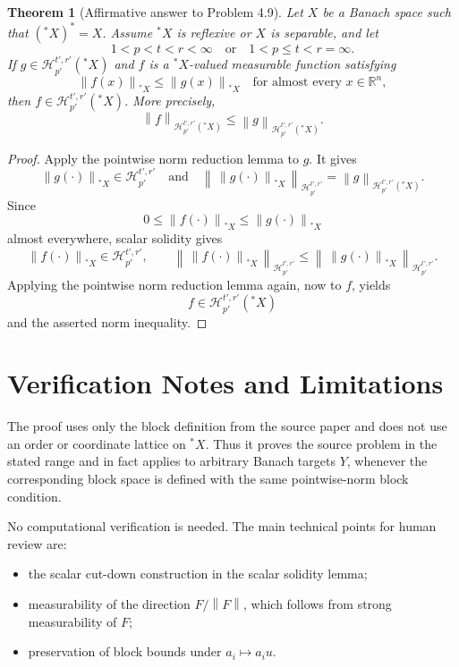 \documentclass[11pt]{article}
\newtheorem{theorem}{Theorem}
\newcommand{\R}{\mathbb{R}}
\newcommand{\Hsp}{\mathcal{H}_{p'}^{t',r'}}
\newcommand{\norm}[1]{\left\|#1\right\|}
\begin{document}
\begin{theorem}[Affirmative answer to Problem 4.9]
Let \(X\) be a Banach space such that \(({}^\ast X)^\ast=X\). Assume
\({}^\ast X\) is reflexive or \(X\) is separable, and let
\[
1<p<t<r<\infty \quad\text{or}\quad 1<p\leq t<r=\infty .
\]
If \(g\in \Hsp({}^\ast X)\) and \(f\) is a \({}^\ast X\)-valued measurable
function satisfying
\[
\norm{f(x)}_{{}^\ast X}\leq\norm{g(x)}_{{}^\ast X}
\quad\text{for almost every }x\in\R^n,
\]
then \(f\in \Hsp({}^\ast X)\). More precisely,
\[
\norm{f}_{\Hsp({}^\ast X)}
\leq
\norm{g}_{\Hsp({}^\ast X)}.
\]
\end{theorem}

\begin{proof}
Apply the pointwise norm reduction lemma to \(g\). It gives
\[
\norm{g(\cdot)}_{{}^\ast X}\in\Hsp
\quad\text{and}\quad
\norm{\,\norm{g(\cdot)}_{{}^\ast X}\,}_{\Hsp}
=\norm{g}_{\Hsp({}^\ast X)} .
\]
Since
\[
0\leq \norm{f(\cdot)}_{{}^\ast X}
\leq \norm{g(\cdot)}_{{}^\ast X}
\]
almost everywhere, scalar solidity gives
\[
\norm{f(\cdot)}_{{}^\ast X}\in\Hsp,\qquad
\norm{\,\norm{f(\cdot)}_{{}^\ast X}\,}_{\Hsp}
\leq
\norm{\,\norm{g(\cdot)}_{{}^\ast X}\,}_{\Hsp}.
\]
Applying the pointwise norm reduction lemma again, now to \(f\), yields
\[
f\in\Hsp({}^\ast X)
\]
and the asserted norm inequality.
\end{proof}

\section*{Verification Notes and Limitations}

The proof uses only the block definition from the source paper and does not
use an order or coordinate lattice on \({}^\ast X\). Thus it proves the source
problem in the stated range and in fact applies to arbitrary Banach targets
\(Y\), whenever the corresponding block space is defined with the same
pointwise-norm block condition.

No computational verification is needed. The main technical points for human
review are:
\begin{itemize}
\item the scalar cut-down construction in the scalar solidity lemma;
\item measurability of the direction \(F/\norm{F}\), which follows from strong
      measurability of \(F\);
\item preservation of block bounds under \(a_i\mapsto a_i u\).
\end{itemize}
\end{document}
